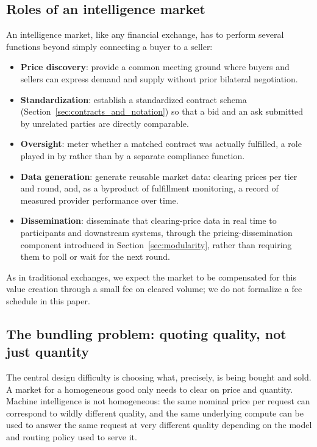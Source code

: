 \subsection{Roles of an intelligence market}
\label{sec:market_roles}

An intelligence market, like any financial exchange, has to perform several
functions beyond simply connecting a buyer to a seller:

\begin{itemize}
  \item \textbf{Price discovery}: provide a common meeting ground where
    buyers and sellers can express demand and supply without prior
    bilateral negotiation.
  \item \textbf{Standardization}: establish a standardized contract schema
    (Section~\ref{sec:contracts_and_notation}) so that a bid and an ask
    submitted by unrelated parties are directly comparable.
  \item \textbf{Oversight}: meter whether a matched contract was actually
    fulfilled, a role played in \Noesis{} by \NoesisServer{} rather than
    by a separate compliance function.
  \item \textbf{Data generation}: generate reusable market data: clearing
    prices per tier and round, and, as a byproduct of fulfillment
    monitoring, a record of measured provider performance over time.
  \item \textbf{Dissemination}: disseminate that clearing-price data in
    real time to participants and downstream systems, through the
    pricing-dissemination component introduced in
    Section~\ref{sec:modularity}, rather than requiring them to poll
    \NoesisMarket{} or wait for the next round.
\end{itemize}

As in traditional exchanges, we expect the market to be compensated for this
value creation through a small fee on cleared volume; we do not formalize a fee
schedule in this paper.

\subsection{The bundling problem: quoting quality, not just quantity}
\label{sec:bundling}

The central design difficulty is choosing what, precisely, is being bought and
sold. A market for a homogeneous good only needs to clear on price and
quantity. Machine intelligence is not homogeneous: the same nominal price per
request can correspond to wildly different quality, and the same underlying
compute can be used to answer the same request at very different quality
depending on the model and routing policy used to serve it.

